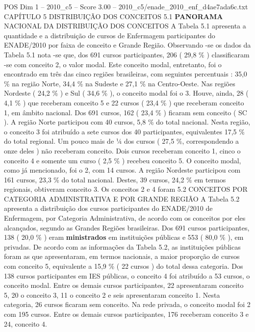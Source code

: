 \begin{textsample}{POS Dim 1 – 2010\_c5 – Score 3.00 – 2010\_c5/enade\_2010\_enf\_d4ae7ada6c.txt}  \label{ex:f1_pos_139}
CAPÍTULO 5 DISTRIBUIÇÃO DOS CONCEITOS 5.1 \textbf{PANORAMA} NACIONAL DA DISTRIBUIÇÃO DOS CONCEITOS A Tabela 5.1 apresenta a quantidade e a distribuição de cursos de Enfermagem participantes do ENADE/2010 por faixa de conceito e Grande Região.
Observando -se os dados da Tabela 5.1 nota -se que, dos 691 cursos participantes, 206 ( 29,8 \% ) classificaram -se com conceito 2, o valor modal.
Este conceito modal, entretanto, foi o encontrado em três das cinco regiões brasileiras, com seguintes percentuais : 35,0 \% na região Norte, 34,4 \% na Sudeste e 27,1 \% na Centro-Oeste.
Nas regiões Nordeste ( 24,2 \% ) e Sul ( 34,6 \% ), o conceito modal foi o 3.
Houve, ainda, 28 ( 4,1 \% ) que receberam conceito 5 e 22 cursos ( 23,4 \% ) que receberam conceito 1, em âmbito nacional.
Dos 691 cursos, 162 ( 23,4 \% ) ficaram sem conceito ( SC ).
A região Norte participou com 40 cursos, 5,8 \% do total nacional.
Nesta região, o conceito 3 foi atribuído a sete cursos dos 40 participantes, equivalentes 17,5 \% do total regional.
Um pouco mais de ¼ dos cursos ( 27,5 \%, correspondendo a onze deles ) não receberam conceito.
Dois cursos receberam conceito 1, cinco o conceito 4 e somente um curso ( 2,5 \% ) recebeu conceito 5.
O conceito modal, como já mencionado, foi o 2, com 14 cursos.
A região Nordeste participou com 161 cursos, 23,3 \% do total nacional.
Destes, 39 cursos, 24,2 \% em termos regionais, obtiveram conceito 3.
Os conceitos 2 e 4 foram 5.2 CONCEITOS POR CATEGORIA ADMINISTRATIVA E POR GRANDE REGIÃO A Tabela 5.2 apresenta a distribuição dos cursos participantes do ENADE/2010 de Enfermagem, por Categoria Administrativa, de acordo com os conceitos por eles alcançados, segundo as Grandes Regiões brasileiras.
Dos 691 cursos participantes, 138 ( 20,0 \% ) eram \textbf{ministrados} em instituições públicas e 553 ( 80,0 \% ), em privadas.
De acordo com as informações da Tabela 5.2, as instituições públicas foram as que apresentaram, em termos nacionais, a maior proporção de cursos com conceito 5, equivalente a 15,9 \% ( 22 cursos ) do total dessa categoria.
Dos 138 cursos participantes em IES públicas, o conceito 4 foi atribuído a 53 cursos, o conceito modal.
Entre os demais cursos participantes, 22 apresentaram conceito 5, 20 o conceito 3, 11 o conceito 2 e seis apresentaram conceito 1.
Nesta categoria, 26 cursos ficaram sem conceito.
Na rede privada, o conceito modal foi 2 com 195 cursos.
Entre os demais cursos participantes, 176 receberam conceito 3 e 24, conceito 4.

\end{textsample}
